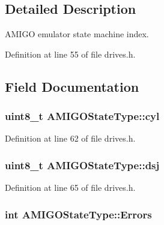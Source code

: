 \subsection{Detailed Description}
A\+M\+I\+GO emulator state machine index. 

Definition at line 55 of file drives.\+h.



\subsection{Field Documentation}
\subsubsection[{\texorpdfstring{cyl}{cyl}}]{\setlength{\rightskip}{0pt plus 5cm}uint8\+\_\+t A\+M\+I\+G\+O\+State\+Type\+::cyl}\hypertarget{structAMIGOStateType_a54b4a4f8221f9d38fb93f2d23a40e305}{}\label{structAMIGOStateType_a54b4a4f8221f9d38fb93f2d23a40e305}


Definition at line 62 of file drives.\+h.

\subsubsection[{\texorpdfstring{dsj}{dsj}}]{\setlength{\rightskip}{0pt plus 5cm}uint8\+\_\+t A\+M\+I\+G\+O\+State\+Type\+::dsj}\hypertarget{structAMIGOStateType_ab2294deecb44cdb1675e4096dba22eb1}{}\label{structAMIGOStateType_ab2294deecb44cdb1675e4096dba22eb1}


Definition at line 65 of file drives.\+h.

\subsubsection[{\texorpdfstring{Errors}{Errors}}]{\setlength{\rightskip}{0pt plus 5cm}int A\+M\+I\+G\+O\+State\+Type\+::\+Errors}\hypertarget{structAMIGOStateType_ad04b5b3ffd8fabff547e6498d534feac}{}\label{structAMIGOStateType_ad04b5b3ffd8fabff547e6498d534feac}


